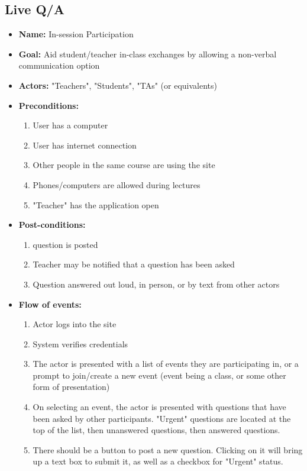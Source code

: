 \documentclass[12pt]{article}
\begin{document}
\subsection{Live Q/A}
\begin{itemize}
    \item \textbf{Name:} In-session Participation
    \item \textbf{Goal:} Aid student/teacher in-class exchanges by allowing a non-verbal communication option
    \item \textbf{Actors:} "Teachers", "Students", "TAs" (or equivalents)
    \item \textbf{Preconditions:}
        \begin{enumerate}
            \item User has a computer
            \item User has internet connection
            \item Other people in the same course are using the site
            \item Phones/computers are allowed during lectures
            \item "Teacher" has the application open
        \end{enumerate}
    \item \textbf{Post-conditions:}
        \begin{enumerate}
            \item question is posted
            \item Teacher may be notified that a question has been asked
            \item Question answered out loud, in person, or by text from other actors
        \end{enumerate}
    \item \textbf{Flow of events:}
        \begin{enumerate}
            \item Actor logs into the site
            \item System verifies credentials
            \item The actor is presented with a list of events they are participating in, or a prompt to join/create a new event (event being a class, or some other form of presentation)
            \item On selecting an event, the actor is presented with questions that have been asked by other participants. "Urgent" questions are located at the top of the list, then unanswered questions, then answered questions.
            \item There should be a button to post a new question. Clicking on it will bring up a text box to submit it, as well as a checkbox for "Urgent" status.

\end{enumerate}
\end{itemize}
\end{document}
